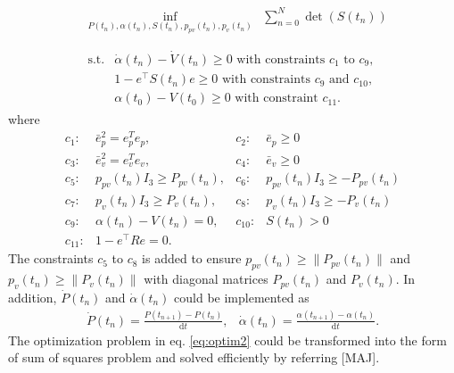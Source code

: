 \documentclass[letterpaper, 10 pt, conference]{ieeeconf}  %
\begin{document}
\begin{align}
&
\begin{array}{rl}
\displaystyle{\inf_{P(t_n),\alpha(t_n),S(t_n),p_{pv}(t_n),p_v(t_n)}} & \displaystyle{\sum_{n=0}^{N}} \det(S(t_n))  \\
\end{array} \label{eq:optim2} \\
&
\begin{array}{rl}
\displaystyle{\text{s.t.}}& \dot{\alpha}(t_n) - \dot{V}(t_n) \geq 0\text{ with constraints $c_1$ to $c_9$},  \\
& 1-e^\top S(t_n) e \geq 0\text{ with constraints $c_9$ and $c_{10}$}, \nonumber \\
& \alpha(t_0) - V(t_0) \geq 0\text{ with constraint $c_{11}$}. \nonumber
\end{array} \nonumber 
\end{align}
where
\begin{equation}
\begin{array}{rlrl}
c_1:& \bar{e}_p^2 = e_p^Te_p,           & c_2:&\bar{e}_p \geq 0 \\
c_3:& \bar{e}_v^2 = e_v^Te_v,           & c_4:&\bar{e}_v \geq 0 \\
c_5:& p_{pv}(t_n)I_3 \geq P_{pv}(t_n),      & c_6:&p_{pv}(t_n)I_3 \geq -P_{pv}(t_n) \\
c_7:& p_{ v}(t_n)I_3 \geq P_{ v}(t_n),      & c_8:&p_{ v}(t_n)I_3 \geq -P_{ v}(t_n) \\
c_9:& \alpha(t_n) - V(t_n) = 0, & c_{10}:&S(t_n) > 0 \\
c_{11}:& 1-e^\top R e = 0. &&
\end{array} \nonumber
\end{equation}
The constraints $c_5$ to $c_8$ is added to ensure
 $p_{pv}(t_n) \geq \|P_{pv}(t_n)\|$ and $p_v(t_n) \geq \|P_v(t_n)\|$ 
with diagonal matrices $P_{pv}(t_n)$ and $P_v(t_n)$.
In addition, $\dot{P}(t_n)$ and $\dot{\alpha}(t_n)$ could be implemented as
\begin{equation}
\begin{array}{cc}
\dot{P}(t_n) = \frac{P(t_{n+1}) - P(t_n)}{\text{d}t}, & \dot{\alpha}(t_n) = \frac{\alpha(t_{n+1})-\alpha(t_n)}{\text{d}t}. 
\end{array} \label{eq:dt}
\end{equation}
The optimization problem in eq. \eqref{eq:optim2} could be transformed into the form of sum of squares problem and solved efficiently by referring [MAJ].
\end{document}
